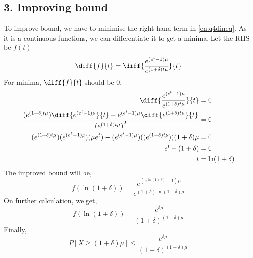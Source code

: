 \begin{solution}
	\section*{3. Improving bound}
	To improve bound, we have to minimise the right hand term in \ref{en:q4dineq}. As it is a continuous functions, we can differentiate it to get a minima. Let the RHS be $f(t)$
	\[\diff{f}{t} = \diff{\frac{e^{(e^t-1)\mu}}{e^{(1+\delta)t\mu}}}{t}\]
	For minima, $\diff{f}{t} $ should be 0.
	\begin{align}
		\diff{\frac{e^{(e^t-1)\mu}}{e^{(1+\delta)t\mu}}}{t} & = 0 \\
		\frac{(e^{(1+\delta)t\mu})\diff{e^{(e^t-1)\mu}}{t}- e^{(e^t-1)\mu}\diff{e^{(1+\delta)t\mu}}{t}}{{(e^{(1+\delta)t\mu})}^2} & = 0 \\
		(e^{(1+\delta)t\mu})(e^{(e^t-1)\mu})(\mu e^t) - (e^{(e^t-1)\mu})((e^{(1+\delta)t\mu}))(1+\delta)\mu & = 0 \\
		e^t - (1+\delta) & = 0 \\
		t & = \ln(1+\delta)
	\end{align}
	The improved bound will be,
	\[f(\ln(1+\delta)) = \frac{e^{(e^{\ln(1+\delta)}-1)\mu}}{e^{(1+\delta){\ln(1+\delta)}\mu}}\]
	On further calculation, we get,
	\[f(\ln(1+\delta)) = \frac{e^{\delta \mu}}{(1+\delta)^{(1+\delta)\mu}}\]
	Finally,
	\[P[X\geq (1+\delta)\mu] \leq \frac{e^{\delta \mu}}{(1+\delta)^{(1+\delta)\mu}}\]



\end{solution}
